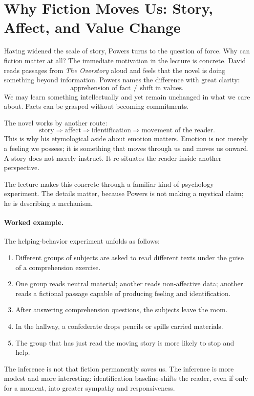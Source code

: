 \section{Why Fiction Moves Us: Story, Affect, and Value Change}

Having widened the scale of story, Powers turns to the question of force. Why can fiction matter at all? The immediate motivation in the lecture is concrete. David reads passages from \emph{The Overstory} aloud and feels that the novel is doing something beyond information. Powers names the difference with great clarity:
\begin{equation}
\text{apprehension of fact} \neq \text{shift in values}.
\end{equation}
We may learn something intellectually and yet remain unchanged in what we care about. Facts can be grasped without becoming commitments.

The novel works by another route:
\begin{equation}
\text{story} \Rightarrow \text{affect} \Rightarrow \text{identification} \Rightarrow \text{movement of the reader}.
\end{equation}
This is why his etymological aside about emotion matters. Emotion is not merely a feeling we possess; it is something that moves through us and moves us onward. A story does not merely instruct. It re-situates the reader inside another perspective.

The lecture makes this concrete through a familiar kind of psychology experiment. The details matter, because Powers is not making a mystical claim; he is describing a mechanism.

\paragraph{Worked example.} The helping-behavior experiment unfolds as follows:
\begin{enumerate}
\item Different groups of subjects are asked to read different texts under the guise of a comprehension exercise.
\item One group reads neutral material; another reads non-affective data; another reads a fictional passage capable of producing feeling and identification.
\item After answering comprehension questions, the subjects leave the room.
\item In the hallway, a confederate drops pencils or spills carried materials.
\item The group that has just read the moving story is more likely to stop and help.
\end{enumerate}
The inference is not that fiction permanently saves us. The inference is more modest and more interesting: identification baseline-shifts the reader, even if only for a moment, into greater sympathy and responsiveness.

